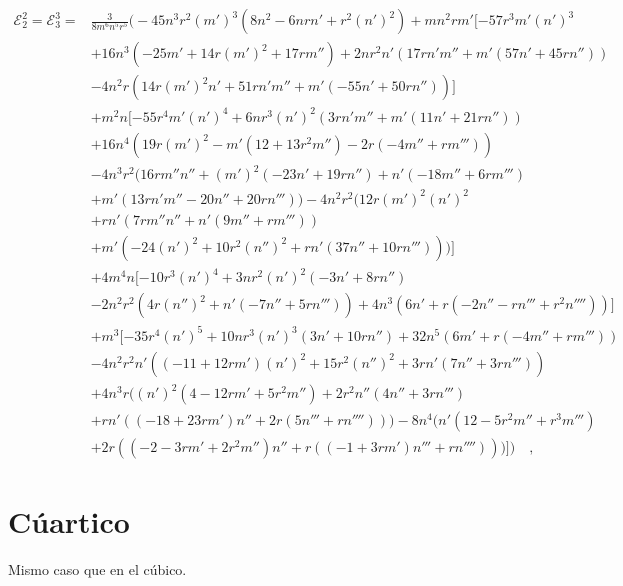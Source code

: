 \documentclass[12pt]{book}
\begin{document}
\begin{equation}
\begin{split}
    \mathcal{E}_2^2=\mathcal{E}_3^3=&\frac{3}{8 m^6 n^5 r^5} \Bigg( -45 n^3 r^2 (m')^3  ( 8 n^2 - 6 n r n' + r^2 (n')^2  ) + m n^2 r m'  [ -57 r^3 m' (n')^3 \\ & + 16 n^3  ( -25 m' + 14 r (m')^2 + 17 r m''  ) + 2 n r^2 n'  ( 17 r n' m'' + m' (57 n' + 45 r n'')  )\\ & - 4 n^2 r  ( 14 r (m')^2 n' + 51 r n' m'' + m' (-55 n' + 50 r n'')  )  ]\\ & + m^2 n  [ -55 r^4 m' (n')^4 + 6 n r^3 (n')^2  ( 3 r n' m'' + m' (11 n' + 21 r n'')  )\\ & + 16 n^4  ( 19 r (m')^2 - m' (12 + 13 r^2 m'') - 2 r (-4 m'' + r m''')  ) \\ & - 4 n^3 r^2  ( 16 r m'' n'' + (m')^2 (-23 n' + 19 r n'') + n' (-18 m'' + 6 r m''')\\ & + m' (13 r n' m'' - 20 n'' + 20 r n''')  ) - 4 n^2 r^2  ( 12 r (m')^2 (n')^2 \\ & + r n'  ( 7 r m'' n'' + n' (9 m'' + r m''')  )\\ & + m'  ( -24 (n')^2 + 10 r^2 (n'')^2 + r n' (37 n'' + 10 r n''')  )  )  ]\\ & + 4 m^4 n  [ -10 r^3 (n')^4 + 3 n r^2 (n')^2 (-3 n' + 8 r n'') \\ &- 2 n^2 r^2  ( 4 r (n'')^2 + n' (-7 n'' + 5 r n''')  ) + 4 n^3  ( 6 n' + r (-2 n'' - r n''' + r^2 n'''')  )  ]\\ & + m^3  [ -35 r^4 (n')^5 + 10 n r^3 (n')^3 (3 n' + 10 r n'') + 32 n^5  ( 6 m' + r (-4 m'' + r m''')  )\\ & - 4 n^2 r^2 n'  ( (-11 + 12 r m') (n')^2 + 15 r^2 (n'')^2 + 3 r n' (7 n'' + 3 r n''')  )\\ & + 4 n^3 r  ( (n')^2 (4 - 12 r m' + 5 r^2 m'') + 2 r^2 n'' (4 n'' + 3 r n''') \\ &+ r n'  ( (-18 + 23 r m') n'' + 2 r (5 n''' + r n'''')  )  ) - 8 n^4  ( n' (12 - 5 r^2 m'' + r^3 m''')\\ & + 2 r  ( (-2 - 3 r m' + 2 r^2 m'') n'' + r ( (-1 + 3 r m') n''' + r n'''' )  )  )  ] \Bigg)\label{eq: ResultadosReales - cubico - S - 22}\quad,
\end{split}
\end{equation}




\section{Cúartico}
Mismo caso que en el cúbico.
\end{document}
